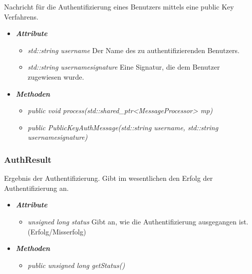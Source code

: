 \documentclass[a4paper,12pt]{article}
\begin{document}
Nachricht für die Authentifizierung eines Benutzers mittels eine public Key Verfahrens.

	\begin{itemize}[label={}]

	\item\textit{\textbf{Attribute}}
		\begin{itemize}[label={\textbullet}]
			
			\item\textit{std::string username} Der Name des zu authentifizierenden Benutzers.
			\item\textit{std::string usernamesignature} Eine Signatur, die dem Benutzer zugewiesen wurde.
		\end{itemize}

	\item\textit{\textbf{Methoden}}
		\begin{itemize}[label={\textbullet}]
			\item\textit{public void process(std::shared\_ptr<MessageProcessor> mp)}
			\item\textit{public PublicKeyAuthMessage(std::string username, std::string usernamesignature)}
		\end{itemize}

\end{itemize}


\subsubsection{AuthResult}

Ergebnis der Authentifizierung. Gibt im wesentlichen den Erfolg der Authentifizierung an.

	\begin{itemize}[label={}]

	\item\textit{\textbf{Attribute}}
		\begin{itemize}[label={\textbullet}]
			\item\textit{unsigned long status} Gibt an, wie die Authentifizierung ausgegangen ist. (Erfolg/Misserfolg)
		\end{itemize}

	\item\textit{\textbf{Methoden}}
		\begin{itemize}[label={\textbullet}]
			\item\textit{public unsigned long getStatus()}
		\end{itemize}

\end{itemize}
\end{document}
